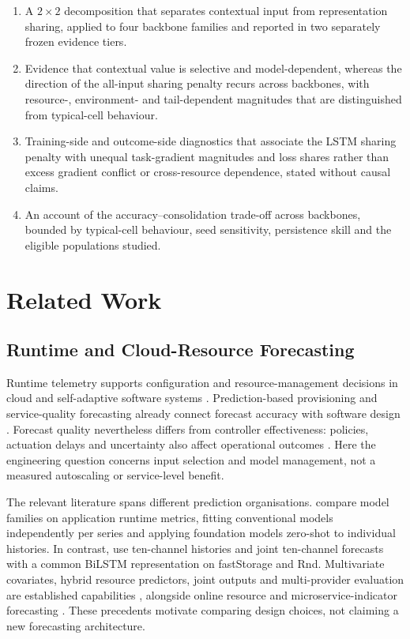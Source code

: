 \documentclass[a4paper,fleqn]{cas-dc}
\begin{document}
\begin{enumerate}
  \item A $2\times2$ decomposition that separates contextual input from
    representation sharing, applied to four backbone families and
    reported in two separately frozen evidence tiers.
  \item Evidence that contextual value is selective and model-dependent,
    whereas the direction of the all-input sharing penalty recurs across
    backbones, with resource-, environment- and tail-dependent magnitudes
    that are distinguished from typical-cell behaviour.
  \item Training-side and outcome-side diagnostics that associate the
    LSTM sharing penalty with unequal task-gradient magnitudes and loss
    shares rather than excess gradient conflict or cross-resource
    dependence, stated without causal claims.
  \item An account of the accuracy--consolidation trade-off across
    backbones, bounded by typical-cell behaviour, seed sensitivity,
    persistence skill and the eligible populations studied.
\end{enumerate}

\section{Related Work}
\label{sec:related-work}

\subsection{Runtime and Cloud-Resource Forecasting}
\label{sec:rw-runtime}

Runtime telemetry supports configuration and resource-management decisions in
cloud and self-adaptive software systems
\citep{Taherizadeh2018Monitoring,Bauer2020SelfAware}. Prediction-based
provisioning and service-quality forecasting already connect forecast accuracy
with software design
\citep{Calheiros2015ARIMA,Syu2017DynamicQoS}. Forecast quality nevertheless
differs from controller effectiveness: policies, actuation delays and
uncertainty also affect operational outcomes \citep{Qu2018Autoscaling}.
Here the engineering question concerns input selection and model management,
not a measured autoscaling or service-level benefit.

The relevant literature spans different prediction organisations.
\citet{DiMenna2026RuntimeForecasting} compare model families on application
runtime metrics, fitting conventional models independently per series and
applying foundation models zero-shot to individual histories. In contrast,
\citet{Ullah2023CloudBiLSTM} use ten-channel histories and joint ten-channel
forecasts with a common BiLSTM representation on fastStorage and Rnd.
Multivariate covariates, hybrid resource predictors, joint outputs and
multi-provider evaluation are established capabilities
\citep{Tran2018MultivariateFuzzy,Xu2022esDNN,Tripathi2025MMRP,
Rossi2025CloudUncertainty,Zhang2025SWTCLSTM}, alongside online resource and
microservice-indicator forecasting \citep{Gao2026OMCR,Gao2026MaMiClif}.
These precedents motivate comparing design choices, not claiming a new
forecasting architecture.
\end{document}
